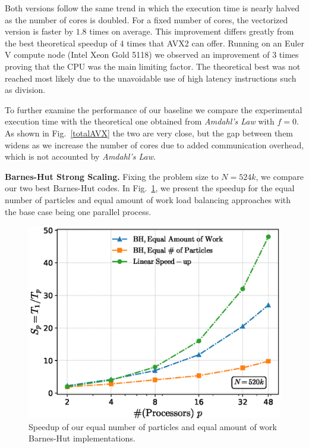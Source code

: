 \documentclass[letterpaper]{article}
\newcommand{\mypar}[1]{{\bf #1.}}
\begin{document}
Both versions follow the same trend in which the execution time is nearly halved as the number of cores is doubled. For a fixed number of cores, the vectorized version is faster by $1.8$ times on average. This improvement differs greatly from the best theoretical speedup of $4$ times that AVX2 can offer. Running on an Euler V compute node (Intel Xeon Gold 5118) we observed an improvement of $3$ times proving that the CPU was the main limiting factor. The theoretical best was not reached most likely due to the unavoidable use of high latency instructions such as division.

To further examine the performance of our baseline we compare the experimental execution time with the theoretical one obtained from \textit{Amdahl's Law} with $f {=} 0$. As shown in Fig.~\ref{totalAVX} the two are very close, but the gap between them widens as we increase the number of cores due to added communication overhead, which is not accounted by \textit{Amdahl's Law}.

\mypar{Barnes-Hut Strong Scaling}
Fixing the problem size to $N{=}524k$, we compare our two best Barnes-Hut codes. In Fig.~\ref{Comparison}, we present the speedup for the equal number of particles and equal amount of work load balancing approaches with the base case being one parallel process.

\begin{figure}[h]
 \centering
  \includegraphics[scale=0.4]{figs/SpeedupNew.eps}
  \caption{Speedup of our equal number of particles and equal amount of work Barnes-Hut implementations.\label{Comparison}}
\end{figure}
\end{document}
